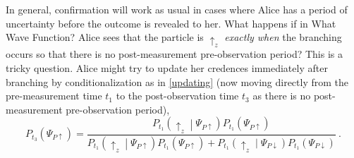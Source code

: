 \documentclass[12pt,onecolumn,secnumarabic,amsmath,amssymb,balancelastpage,nofootinbib]{article}
\begin{document}
In general, confirmation will work as usual in cases where Alice has a period of uncertainty before the outcome is revealed to her.  What happens if in {\sc What Wave Function?} Alice sees that the particle is $\uparrow_z$ \emph{exactly when} the branching occurs so that there is no post-measurement pre-observation period?  This is a tricky question.  Alice might try to update her credences immediately after branching by conditionalization as in \eqref{updating} (now moving directly from the pre-measurement time $t_1$ to the post-observation time $t_3$ as there is no post-measurement pre-observation period),
\begin{equation}
P_{t_3}\left(\Psi_{P\uparrow}\right)=\frac{P_{t_1}\left(\uparrow_z\middle|\Psi_{P\uparrow}\right)P_{t_1}\left(\Psi_{P\uparrow}\right)}{P_{t_1}\left(\uparrow_z\middle|\Psi_{P\uparrow}\right)P_{t_1}\left(\Psi_{P\uparrow}\right)+P_{t_1}\left(\uparrow_z\middle|\Psi_{P\downarrow}\right)P_{t_1}\left(\Psi_{P\downarrow}\right)}\ .
\label{}
\end{equation}
\end{document}
